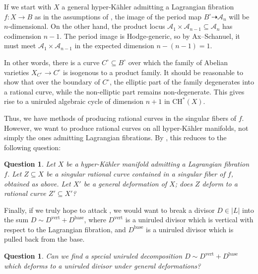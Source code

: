 \documentclass[12pt]{amsart}
\newcommand{\cA}{\mathcal{A}}
\newtheorem{question}[theorem]{Question}
\theoremstyle{definition}
\numberwithin{equation}{section}
\begin{document}
If we start with \(X\) a general hyper-K\"ahler admitting a Lagrangian fibration 
\(f: X \to B\) as in the assumptions of , the image of the 
period map \(B^\circ \dashrightarrow \cA_n\) will be \(n\)-dimensional. On the other 
hand, the product locus \(\cA_1 \times \cA_{n-1} \subseteq \cA_n\) has 
codimension \(n-1\). The period image is Hodge-generic, so by Ax--Schanuel, it must 
meet \(\cA_1 \times \cA_{n-1}\) in the expected dimension \(n - (n-1) = 1\). 

In other words, there is a curve \(C^\circ \subseteq B^\circ\) over which the 
family of Abelian varieties \(X_{C^\circ} \to C^\circ\) is isogenous to 
a product family. It should be reasonable to show that over the boundary of \(C^\circ\), 
the elliptic part of the family degenerates into a rational curve, while the 
non-elliptic part remains non-degenerate. This gives rise to a uniruled algebraic 
cycle of dimension \(n+1\) in \(\mathrm{CH}^*(X)\).

Thus, we have methods of producing rational curves in the singular fibers of \(f\). 
However, we want to produce rational curves on all hyper-K\"ahler manifolds, not simply 
the ones admitting Lagrangian fibrations. By ,
this reduces to the following question:
\begin{question}
    Let \(X\) be a hyper-K\"ahler manifold admitting a Lagrangian fibration \(f\). 
    Let \(Z \subseteq X\) be a singular rational curve contained in a singular fiber 
    of \(f\), obtained as above. Let \(X'\) be a general deformation of \(X\); 
    does \(Z\) deform to a rational curve \(Z' \subseteq X'\)?
\end{question}

Finally, if we truly hope to attack , we would want to break 
a divisor \(D \in |L|\) into the sum \(D \sim D^\mathrm{vert} + D^\mathrm{base}\), 
where \(D^\mathrm{vert}\) is a uniruled divisor which is vertical with respect to the Lagrangian 
fibration, and \(D^\mathrm{base}\) is a uniruled divisor which is pulled back from 
the base. 

\begin{question}
    Can we find a special uniruled decomposition 
    \(D \sim D^\mathrm{vert} + D^\mathrm{base}\) which deforms to a uniruled divisor 
    under general deformations?
\end{question}





\end{document}
